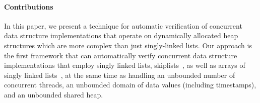 
\paragraph{Contributions}
In this paper, we present a technique for automatic verification of concurrent
data structure implementations that operate on dynamically allocated
heap structures which are more complex than just singly-linked lists.
Our approach is the first framework that
can automatically verify concurrent data structure implementations that employ
singly linked lists, skiplists~\cite{Fomitchev:2004,ArtOfMpP,Sundell:2005},
as well as arrays of singly linked lists~\cite{ts-stack},
at the same time as handling an unbounded
number of concurrent threads, an unbounded domain of data values
(including timestamps), and an unbounded shared heap.

